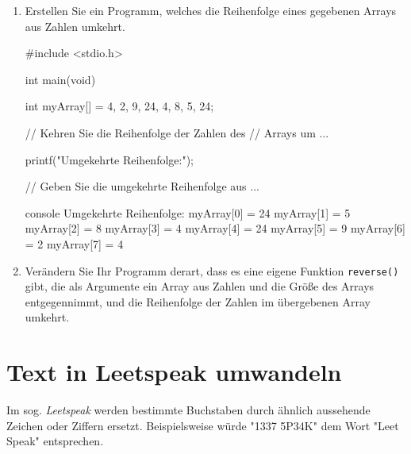 \begin{enumerate}
    \item Erstellen Sie ein Programm, welches die Reihenfolge eines gegebenen
    Arrays aus Zahlen umkehrt.

\Vorlage
\begin{codebox}[lang=c, fontsize=\small]
#include <stdio.h>

int main(void) {
    int myArray[] = {4, 2, 9, 24, 4, 8, 5, 24};

    // Kehren Sie die Reihenfolge der Zahlen des
    // Arrays um ...

    printf("Umgekehrte Reihenfolge:\n");

    // Geben Sie die umgekehrte Reihenfolge aus ...
}
\end{codebox}

\begin{mybox}[Bildschirmausgabe]{console}
Umgekehrte Reihenfolge:
myArray[0] = 24
myArray[1] = 5
myArray[2] = 8
myArray[3] = 4
myArray[4] = 24
myArray[5] = 9
myArray[6] = 2
myArray[7] = 4
\end{mybox}

  \item Verändern Sie Ihr Programm derart, dass es eine eigene Funktion
  \texttt{reverse()} gibt, die als Argumente ein Array aus Zahlen und die
  Größe des Arrays entgegennimmt, und die Reihenfolge der Zahlen im übergebenen
  Array umkehrt.
\end{enumerate}




\chapter{Text in Leetspeak umwandeln}

\vspace{10pt}

Im sog. \textit{Leetspeak} werden bestimmte Buchstaben durch ähnlich aussehende
Zeichen oder Ziffern ersetzt. Beispielsweise würde "\textsf{1337 5P34K}" dem
Wort "\textsf{Leet Speak}" entsprechen.

